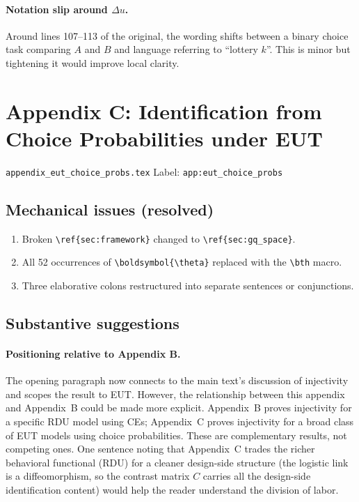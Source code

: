 \documentclass[11pt,a4paper]{article}
\begin{document}
\paragraph{Notation slip around $\Delta u$.}
Around lines 107--113 of the original, the wording shifts between a
binary choice task comparing $A$ and $B$ and language referring to
``lottery $k$''. This is minor but tightening it would improve local
clarity.


\section{Appendix C: Identification from Choice Probabilities under EUT}

\texttt{appendix\_eut\_choice\_probs.tex} \hfill Label:
\texttt{app:eut\_choice\_probs}

\subsection{Mechanical issues (resolved)}

\begin{enumerate}[label=\arabic*.]
  \item Broken \texttt{\textbackslash ref\{sec:framework\}} changed to
    \texttt{\textbackslash ref\{sec:gq\_space\}}.
  \item All 52 occurrences of
    \texttt{\textbackslash boldsymbol\{\textbackslash theta\}} replaced
    with the \texttt{\textbackslash bth} macro.
  \item Three elaborative colons restructured into separate sentences or
    conjunctions.
\end{enumerate}

\subsection{Substantive suggestions}

\paragraph{Positioning relative to Appendix B.}
The opening paragraph now connects to the main text's discussion of
injectivity and scopes the result to EUT. However, the relationship
between this appendix and Appendix~B could be made more explicit.
Appendix~B proves injectivity for a specific RDU model using CEs;
Appendix~C proves injectivity for a broad class of EUT models using
choice probabilities. These are complementary results, not competing
ones. One sentence noting that Appendix~C trades the richer behavioral
functional (RDU) for a cleaner design-side structure (the logistic link
is a diffeomorphism, so the contrast matrix $C$ carries all the
design-side identification content) would help the reader understand the
division of labor.
\end{document}
